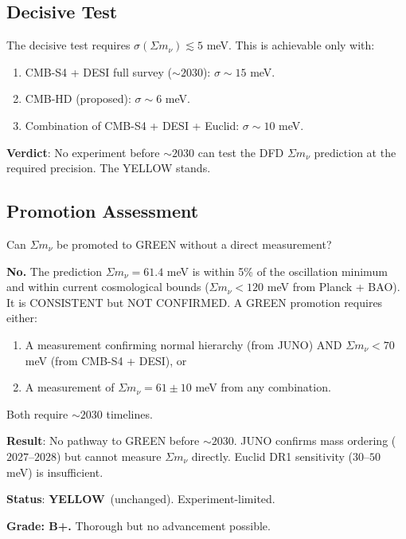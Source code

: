\documentclass[11pt,a4paper]{article}
\newcommand{\YELLOW}{\textcolor{dfdyellow}{\textbf{YELLOW}}}
\begin{document}
\subsection{Decisive Test}

The decisive test requires $\sigma(\Sigma m_\nu) \lesssim 5$ meV. This is achievable only with:
\begin{enumerate}
\item CMB-S4 + DESI full survey ($\sim 2030$): $\sigma \sim 15$ meV.
\item CMB-HD (proposed): $\sigma \sim 6$ meV.
\item Combination of CMB-S4 + DESI + Euclid: $\sigma \sim 10$ meV.
\end{enumerate}

\textbf{Verdict}: No experiment before $\sim 2030$ can test the DFD $\Sigma m_\nu$ prediction at the required precision. The YELLOW stands.

\subsection{Promotion Assessment}

Can $\Sigma m_\nu$ be promoted to GREEN without a direct measurement?

\textbf{No.} The prediction $\Sigma m_\nu = 61.4$ meV is within 5\% of the oscillation minimum and within current cosmological bounds ($\Sigma m_\nu < 120$ meV from Planck + BAO). It is CONSISTENT but NOT CONFIRMED. A GREEN promotion requires either:
\begin{enumerate}
\item A measurement confirming normal hierarchy (from JUNO) AND $\Sigma m_\nu < 70$ meV (from CMB-S4 + DESI), or
\item A measurement of $\Sigma m_\nu = 61 \pm 10$ meV from any combination.
\end{enumerate}

Both require $\sim 2030$ timelines.

\begin{tcolorbox}[colback=yellow!5!white, colframe=yellow!60!black, title={Agent 9: $\Sigma m_\nu$ --- Remains YELLOW (Experiment-Limited)}]
\textbf{Result}: No pathway to GREEN before $\sim 2030$. JUNO confirms mass ordering ($2027$--$2028$) but cannot measure $\Sigma m_\nu$ directly. Euclid DR1 sensitivity ($30$--$50$ meV) is insufficient.

\textbf{Status}: \YELLOW\ (unchanged). Experiment-limited.

\textbf{Grade: B+.} Thorough but no advancement possible.
\end{tcolorbox}
\end{document}

